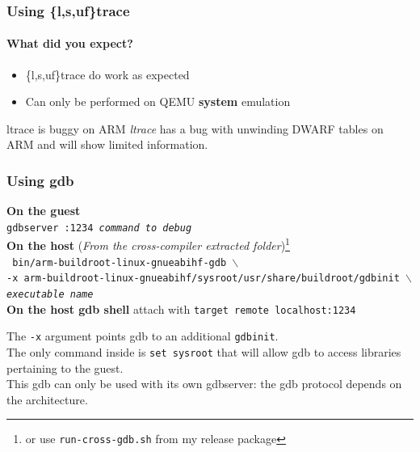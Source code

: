 \begin{frame}
  \frametitle{Using \{l,s,uf\}trace}
   {
    \framesubtitle{What did you expect?}
  }
  \begin{itemize}
    \item \{l,s,uf\}trace do work as expected
    \item Can only be performed on QEMU \textbf{system} emulation
  \end{itemize}
  \begin{alertblock}{ltrace is buggy on ARM}
    \textit{ltrace} has a bug with unwinding DWARF tables on ARM and will show limited information.
  \end{alertblock}
\end{frame}
\begin{frame}
  \frametitle{\hypertarget{using gdb}{Using gdb}}
  \textbf{On the guest} \\
  \texttt{gdbserver :1234 \textit{command to debug}} \\
  \textbf{On the host} (\textit{From the cross-compiler extracted folder})\footnote{or use \texttt{run-cross-gdb.sh} from my release package} \\
  \texttt{
    \small
    bin/{\tiny arm-buildroot-linux-gnueabihf-}gdb $\backslash$ \\
      \quad -x {\tiny arm-buildroot-linux-gnueabihf}/sysroot/usr/share/buildroot/gdbinit $\backslash$ \\
      \quad \textit{executable name}
  } \\
  \textbf{On the host gdb shell} attach with \texttt{target remote localhost:1234}
\end{frame}
 {
  The \texttt{-x} argument points gdb to an additional \texttt{gdbinit}. \\
  The only command inside is \texttt{set sysroot} that will allow gdb to access libraries pertaining to the guest. \\
  This gdb can only be used with its own gdbserver: the gdb protocol depends on the architecture. \\
}

